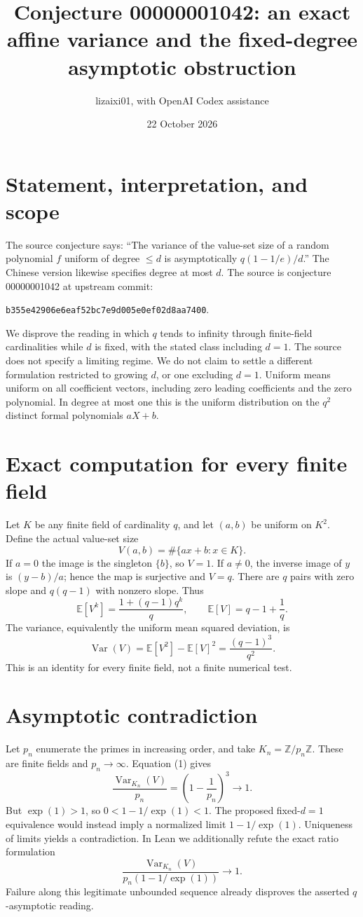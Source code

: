 \documentclass[11pt]{article}
\title{Conjecture 00000001042: an exact affine variance and the fixed-degree asymptotic obstruction}
\author{lizaixi01, with OpenAI Codex assistance}
\date{22 October 2026}
\begin{document}
\maketitle

\section{Statement, interpretation, and scope}
The source conjecture says: ``The variance of the value-set size of a random
polynomial $f$ uniform of degree $\leq d$ is asymptotically
$q(1-1/e)/d$.'' The Chinese version likewise specifies degree at most $d$.
The source is conjecture 00000001042 at upstream commit:\par\noindent
\texttt{b355e42906e6eaf52bc7e9d005e0ef02d8aa7400}.

We disprove the reading in which $q$ tends to infinity through finite-field
cardinalities while $d$ is fixed, with the stated class including $d=1$.
The source does not specify a limiting regime. We do not claim to settle a
different formulation restricted to growing $d$, or one excluding $d=1$.
Uniform means uniform on all coefficient vectors, including zero leading
coefficients and the zero polynomial. In degree at most one this is the
uniform distribution on the $q^2$ distinct formal polynomials $aX+b$.

\section{Exact computation for every finite field}
Let $K$ be any finite field of cardinality $q$, and let $(a,b)$ be uniform
on $K^2$. Define the actual value-set size
\[
 V(a,b)=\#\{ax+b:x\in K\}.
\]
If $a=0$ the image is the singleton $\{b\}$, so $V=1$.
If $a\ne0$, the inverse image of $y$ is $(y-b)/a$; hence the map is
surjective and $V=q$. There are $q$ pairs with zero slope and $q(q-1)$
with nonzero slope. Thus
\[
 \mathbb E[V^k]=\frac{1+(q-1)q^k}{q},\qquad
 \mathbb E[V]=q-1+\frac1q.
\]
The variance, equivalently the uniform mean squared deviation, is
\[
 \operatorname{Var}(V)=\mathbb E[V^2]-\mathbb E[V]^2
     =\frac{(q-1)^3}{q^2}.                         \tag{1}
\]
This is an identity for every finite field, not a finite numerical test.

\section{Asymptotic contradiction}
Let $p_n$ enumerate the primes in increasing order, and take
$K_n=\mathbb Z/p_n\mathbb Z$. These are finite fields and $p_n\to\infty$.
Equation (1) gives
\[
 \frac{\operatorname{Var}_{K_n}(V)}{p_n}
    =\left(1-\frac1{p_n}\right)^3\longrightarrow 1.
\]
But $\exp(1)>1$, so $0<1-1/\exp(1)<1$.
The proposed fixed-$d=1$ equivalence would instead imply a normalized
limit $1-1/\exp(1)$. Uniqueness of limits yields a contradiction.
In Lean we additionally refute the exact ratio formulation
\[
 \frac{\operatorname{Var}_{K_n}(V)}{p_n(1-1/\exp(1))}\longrightarrow 1.
\]
Failure along this legitimate unbounded sequence already disproves the
asserted $q$-asymptotic reading.
\end{document}
